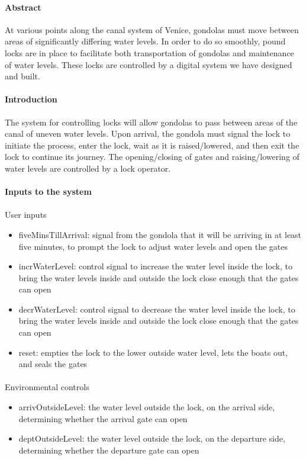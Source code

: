 \documentclass{article}
\begin{document}
      \paragraph{Abstract} At various points along the canal system of Venice, gondolas must move between areas of significantly differing water levels. In order to do so smoothly, pound locks are in place to facilitate both transportation of gondolas and maintenance of water levels. These locks are controlled by a digital system we have designed and built.

      \paragraph{Introduction} The system for controlling locks will allow gondolas to pass between areas of the canal of uneven water levels. Upon arrival, the gondola must signal the lock to initiate the process, enter the lock, wait as it is raised/lowered, and then exit the lock to continue its journey. The opening/closing of gates and raising/lowering of water levels are controlled by a lock operator.

      \paragraph{Inputs to the system}
      \paragraph{} User inputs
      \begin{itemize}
        \item fiveMinsTillArrival: signal from the gondola that it will be arriving in at least five minutes, to prompt the lock to adjust water levels and open the gates
        \item incrWaterLevel: control signal to increase the water level inside the lock, to bring the water levels inside and outside the lock close enough that the gates can open
        \item decrWaterLevel: control signal to decrease the water level inside the lock, to bring the water levels inside and outside the lock close enough that the gates can open
        \item reset: empties the lock to the lower outside water level, lets the boats out, and seals the gates
      \end{itemize}

      \paragraph{} Environmental controls
      \begin{itemize}
        \item arrivOutsideLevel: the water level outside the lock, on the arrival side, determining whether the arrival gate can open
        \item deptOutsideLevel: the water level outside the lock, on the departure side, determining whether the departure gate can open
      \end{itemize}
\end{document}
